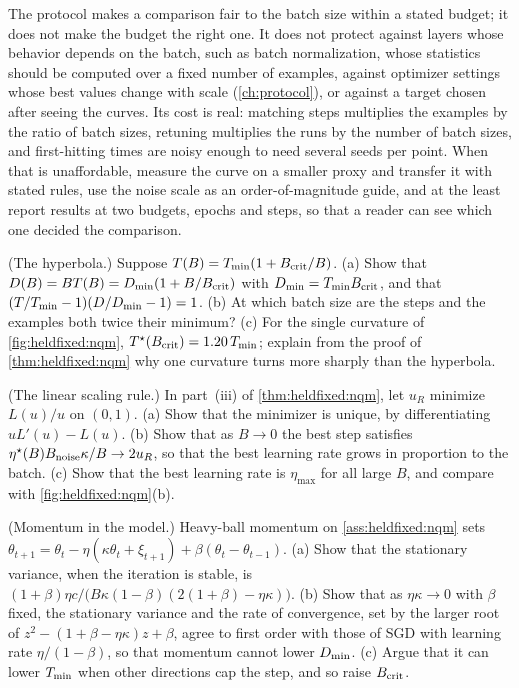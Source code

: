 \begin{refsection}
The protocol makes a comparison fair to the batch size within a stated budget; it does not make the budget the right one. It does not protect against layers whose behavior depends on the batch, such as batch normalization, whose statistics should be computed over a fixed number of examples, against optimizer settings whose best values change with scale (\cref{ch:protocol}), or against a target chosen after seeing the curves. Its cost is real: matching steps multiplies the examples by the ratio of batch sizes, retuning multiplies the runs by the number of batch sizes, and first-hitting times are noisy enough to need several seeds per point. When that is unaffordable, measure the curve on a smaller proxy and transfer it with stated rules, use the noise scale as an order-of-magnitude guide, and at the least report results at two budgets, epochs and steps, so that a reader can see which one decided the comparison.

\begin{exercises}
\item \consolidation (The hyperbola.) Suppose $T(B)=T_{\min}(1+B_{\mathrm{crit}}/B)$. (a) Show that $D(B)=BT(B)=D_{\min}(1+B/B_{\mathrm{crit}})$ with $D_{\min}=T_{\min}B_{\mathrm{crit}}$, and that $(T/T_{\min}-1)(D/D_{\min}-1)=1$. (b) At which batch size are the steps and the examples both twice their minimum? (c) For the single curvature of \cref{fig:heldfixed:nqm}, $T^\star(B_{\mathrm{crit}})=1.20\,T_{\min}$; explain from the proof of \cref{thm:heldfixed:nqm} why one curvature turns more sharply than the hyperbola.\label{ex:heldfixed:hyperbola}

\item \consolidation (The linear scaling rule.) In part~(iii) of \cref{thm:heldfixed:nqm}, let $u_R$ minimize $L(u)/u$ on $(0,1)$. (a) Show that the minimizer is unique, by differentiating $uL'(u)-L(u)$. (b) Show that as $B\to0$ the best step satisfies $\eta^\star(B)B_{\mathrm{noise}}\kappa/B\to2u_R$, so that the best learning rate grows in proportion to the batch. (c) Show that the best learning rate is $\eta_{\max}$ for all large $B$, and compare with \cref{fig:heldfixed:nqm}(b).\label{ex:heldfixed:linear}

\item \consolidation\hard (Momentum in the model.) Heavy-ball momentum on \cref{ass:heldfixed:nqm} sets $\theta_{t+1}=\theta_t-\eta(\kappa\theta_t+\xi_{t+1})+\beta(\theta_t-\theta_{t-1})$. (a) Show that the stationary variance, when the iteration is stable, is $(1+\beta)\eta c/\bigl(B\kappa(1-\beta)(2(1+\beta)-\eta\kappa)\bigr)$. (b) Show that as $\eta\kappa\to0$ with $\beta$ fixed, the stationary variance and the rate of convergence, set by the larger root of $z^2-(1+\beta-\eta\kappa)z+\beta$, agree to first order with those of SGD with learning rate $\eta/(1-\beta)$, so that momentum cannot lower $D_{\min}$. (c) Argue that it can lower $T_{\min}$ when other directions cap the step, and so raise $B_{\mathrm{crit}}$. \label{ex:heldfixed:momentum}


\end{exercises}
\end{refsection}
